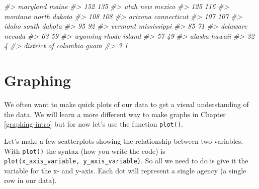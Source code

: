 \documentclass[
]{krantz}
\makeatletter
\newenvironment{Shaded}{\begin{snugshade}}{\end{snugshade}}
\newcommand{\CommentTok}[1]{\textcolor[rgb]{0.37,0.37,0.37}{\textit{#1}}}
\newcommand{\FunctionTok}[1]{\textcolor[rgb]{0,0,0}{#1}}
\newcommand{\NormalTok}[1]{#1}
\newcommand{\SpecialCharTok}[1]{\textcolor[rgb]{0,0,0}{#1}}
\newenvironment{kframe}{%
\medskip{}
\setlength{\fboxsep}{.8em}
 \def\at@end@of@kframe{}%
 \ifinner\ifhmode%
  \def\at@end@of@kframe{\end{minipage}}%
  \begin{minipage}{\columnwidth}%
 \fi\fi%
 \def\FrameCommand##1{\hskip\@totalleftmargin \hskip-\fboxsep
 \colorbox{shadecolor}{##1}\hskip-\fboxsep
     \hskip-\linewidth \hskip-\@totalleftmargin \hskip\columnwidth}%
 \MakeFramed {\advance\hsize-\width
   \@totalleftmargin\z@ \linewidth\hsize
   \@setminipage}}%
 {\par\unskip\endMakeFramed%
 \at@end@of@kframe}
\renewenvironment{Shaded}{\begin{kframe}}{\end{kframe}}
\makeatother
\begin{document}
\begin{Shaded}
\begin{Highlighting}[]
\CommentTok{\#\textgreater{}             maryland                maine }
\CommentTok{\#\textgreater{}                  152                  135 }
\CommentTok{\#\textgreater{}                 utah           new mexico }
\CommentTok{\#\textgreater{}                  125                  116 }
\CommentTok{\#\textgreater{}              montana         north dakota }
\CommentTok{\#\textgreater{}                  108                  108 }
\CommentTok{\#\textgreater{}              arizona          connecticut }
\CommentTok{\#\textgreater{}                  107                  107 }
\CommentTok{\#\textgreater{}                idaho         south dakota }
\CommentTok{\#\textgreater{}                   95                   92 }
\CommentTok{\#\textgreater{}              vermont          mississippi }
\CommentTok{\#\textgreater{}                   85                   71 }
\CommentTok{\#\textgreater{}             delaware               nevada }
\CommentTok{\#\textgreater{}                   63                   59 }
\CommentTok{\#\textgreater{}              wyoming         rhode island }
\CommentTok{\#\textgreater{}                   57                   49 }
\CommentTok{\#\textgreater{}               alaska               hawaii }
\CommentTok{\#\textgreater{}                   32                    4 }
\CommentTok{\#\textgreater{} district of columbia                 guam }
\CommentTok{\#\textgreater{}                    3                    1}
\end{Highlighting}
\end{Shaded}

\hypertarget{graphing}{%
\section{Graphing}\label{graphing}}

We often want to make quick plots of our data to get a visual understanding of the data. We will learn a more different way to make graphs in Chapter \ref{graphing-intro} but for now let's use the function \texttt{plot()}.

Let's make a few scatterplots showing the relationship between two variables. With \texttt{plot()} the syntax (how you write the code) is \texttt{plot(x\_axis\_variable,\ y\_axis\_variable)}. So all we need to do is give it the variable for the x- and y-axis. Each dot will represent a single agency (a single row in our data).

\begin{Shaded}
\end{Shaded}
\end{document}
